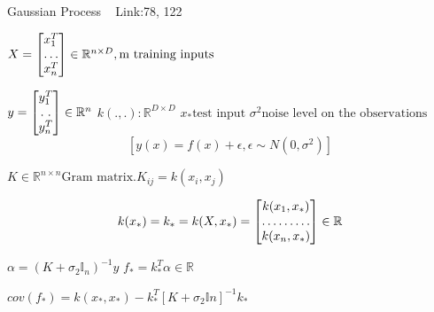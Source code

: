\documentclass[a4paper]{article}
\begin{document}
 \begin{algorithm}
   \caption{Gaussian Process ~\cite{gaussian1
   } Link:78, 122}
    \begin{algorithmic}[1]
  \INPUT 
 \Statex $X =  \begin{bmatrix}
 	x_{1}^T\\
 	\hdotsfor{1}\\
    x_{n}^T 
 \end{bmatrix} \in 	\mathbb{R}^{ n \times D} , \text{m training inputs}
 $
 
  \Statex $y =  \begin{bmatrix}
 	y_{1}^T\\
 	\hdotsfor{1}\\
    y_{n}^T 
 \end{bmatrix} \in 	\mathbb{R}^{ n}
 $ 
 \Statex $k(.,.): \mathbb{R}^ {D \times D}$
 \Statex $x_{*} \text{test input}$
 \Statex $\sigma^{2} \text{noise level on the observations}$
 $$[y(x) = f(x) + \epsilon , \epsilon \sim N (0, \sigma^{2})] $$

\State $K \in \mathbb{R}^{n \times n} \text{Gram matrix}. K_{ij} = k(x_{i}, x_{j})
$

$$k(x_{*}) = k_{*} = k(X,x_{*}) = \begin{bmatrix}
	k{(x_{1},x_{*})}\\
 	\hdotsfor{1}\\
    k{(x_{n},x_{*})}
 \end{bmatrix} \in \mathbb{R}
 $$
 
 \State $\alpha = (K + \sigma_{2}\mathbb{I}_{n})^{-1}y$
 \State $f_{*} = k_{*}^{T}\alpha \in \mathbb{R} $
 
 \State $cov(f_{*}) = k(x_{*},x_{*}) - k_{*}^T[K+\sigma_{2}\mathbb{I}n]^{-1}k_{*}$



\end{algorithmic}
\end{algorithm}
\end{document}
